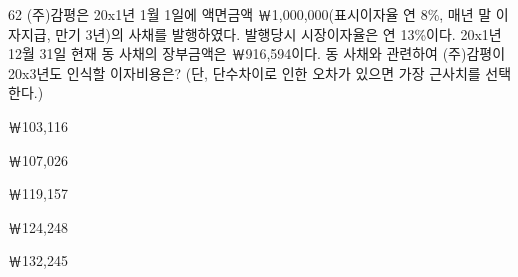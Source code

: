 \begin{question}{62}
(주)감평은 20x1년 1월 1일에 액면금액 ￦1,000,000(표시이자율 연 8\%, 매년 말 이자지급, 만기 3년)의 사채를 발행하였다. 발행당시 시장이자율은 연 13\%이다. 20x1년 12월 31일 현재 동 사채의 장부금액은 ￦916,594이다. 동 사채와 관련하여 (주)감평이 20x3년도 인식할 이자비용은? (단, 단수차이로 인한 오차가 있으면 가장 근사치를 선택한다.)
\begin{choices}
  \item ￦103,116
  \item ￦107,026
  \item ￦119,157
  \item ￦124,248
  \item ￦132,245
\end{choices}
\end{question}
